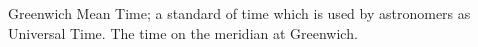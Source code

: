 Greenwich Mean Time; a standard of time which is used by
astronomers as Universal Time. The time on the meridian at
Greenwich.